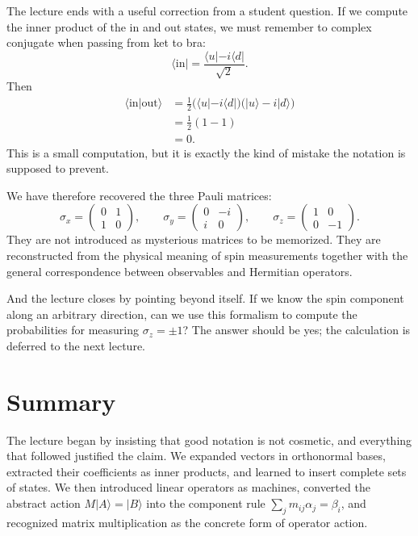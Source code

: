 The lecture ends with a useful correction from a student question. If we compute the inner product of the in and out states, we must remember to complex conjugate when passing from ket to bra:
\begin{equation}
\langle \mathrm{in}|=\frac{\langle u|-i\langle d|}{\sqrt2}.
\end{equation}
Then
\begin{align}
\langle \mathrm{in}|\mathrm{out}\rangle
  &= \frac{1}{2}\bigl(\langle u|-i\langle d|\bigr)\bigl(|u\rangle-i|d\rangle\bigr) \\
  &= \frac{1}{2}(1-1) \\
  &= 0.
\end{align}
This is a small computation, but it is exactly the kind of mistake the notation is supposed to prevent.

We have therefore recovered the three Pauli matrices:
\begin{equation}
\sigma_x=
\begin{pmatrix}
0 & 1 \\
1 & 0
\end{pmatrix},
\qquad
\sigma_y=
\begin{pmatrix}
0 & -i \\
i & 0
\end{pmatrix},
\qquad
\sigma_z=
\begin{pmatrix}
1 & 0 \\
0 & -1
\end{pmatrix}.
\end{equation}
They are not introduced as mysterious matrices to be memorized. They are reconstructed from the physical meaning of spin measurements together with the general correspondence between observables and Hermitian operators.

And the lecture closes by pointing beyond itself. If we know the spin component along an arbitrary direction, can we use this formalism to compute the probabilities for measuring \(\sigma_z=\pm1\)? The answer should be yes; the calculation is deferred to the next lecture.

\section{Summary}

The lecture began by insisting that good notation is not cosmetic, and everything that followed justified the claim. We expanded vectors in orthonormal bases, extracted their coefficients as inner products, and learned to insert complete sets of states. We then introduced linear operators as machines, converted the abstract action \(M|A\rangle=|B\rangle\) into the component rule \(\sum_j m_{ij}\alpha_j=\beta_i\), and recognized matrix multiplication as the concrete form of operator action.

